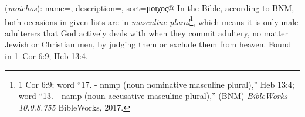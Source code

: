 \item[Adulterer,]

(\textit{moichos}):
{
    name=,
    description={},
    sort=μοιχος@
}
In the Bible, according to BNM, both occasions in given lists are in \emph{masculine plural}\footnote{1 Cor 6:9; word ``17.  - nnmp (noun nominative masculine plural),'' Heb 13:4; word ``13.  - namp (noun accusative masculine plural),'' (BNM) \emph{BibleWorks 10.0.8.755} BibleWorks, 2017.}, which means it is only male adulterers that God actively deals with when they commit adultery, no matter Jewish or Christian men, by judging them or exclude them from heaven. 
Found in 1~Cor 6:9; Heb 13:4.
